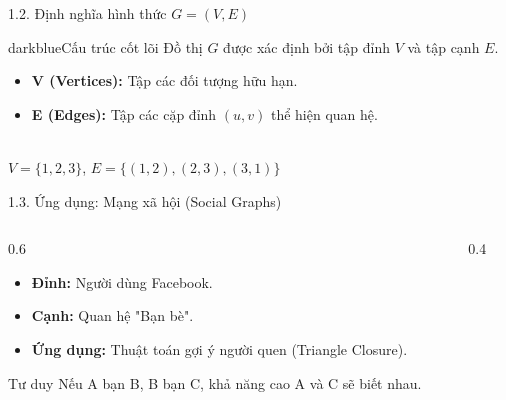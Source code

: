\documentclass[10pt, xcolor={dvipsnames}]{beamer}
\begin{document}
\begin{frame}{1.2. Định nghĩa hình thức $G = (V, E)$}
    \begin{detailbox}{darkblue}{Cấu trúc cốt lõi}
        Đồ thị $G$ được xác định bởi tập đỉnh $V$ và tập cạnh $E$.
    \end{detailbox}
    \begin{itemize}
        \item \textbf{V (Vertices):} Tập các đối tượng hữu hạn.
        \item \textbf{E (Edges):} Tập các cặp đỉnh $(u, v)$ thể hiện quan hệ.
    \end{itemize}
    \centering
    \\ \small $V = \{1, 2, 3\}$, $E = \{(1,2), (2,3), (3,1)\}$
\end{frame}

\begin{frame}{1.3. Ứng dụng: Mạng xã hội (Social Graphs)}
    \begin{columns}
        \begin{column}{0.6\textwidth}
            \begin{itemize}
                \item \textbf{Đỉnh:} Người dùng Facebook.
                \item \textbf{Cạnh:} Quan hệ "Bạn bè".
                \item \textbf{Ứng dụng:} Thuật toán gợi ý người quen (Triangle Closure).
            \end{itemize}
            \begin{exampleblock}{Tư duy}
                Nếu A bạn B, B bạn C, khả năng cao A và C sẽ biết nhau.
            \end{exampleblock}
        \end{column}
        \begin{column}{0.4\textwidth}
            \centering
        \end{column}
    \end{columns}
\end{frame}
\end{document}
